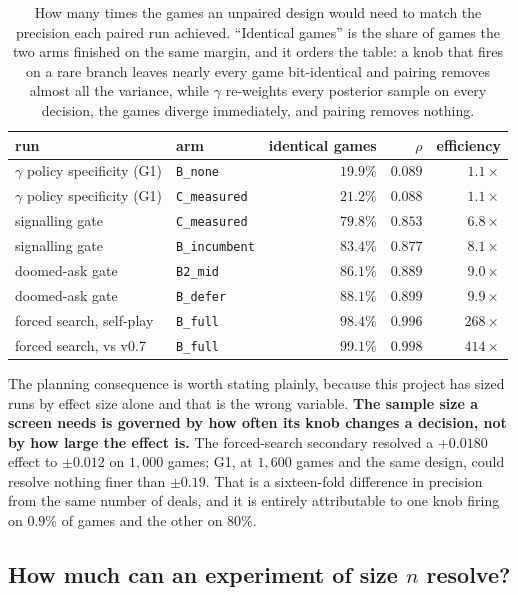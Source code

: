 \documentclass[11pt,a4paper]{article}
\begin{document}
\begin{table}[t]
\centering
\begin{tabular}{llrrr}
\toprule
run & arm & identical games & $\rho$ & efficiency \\
\midrule
$\gamma$ policy specificity (G1) & \texttt{B\_none} & $19.9\%$ & $0.089$ & $1.1\times$ \\
$\gamma$ policy specificity (G1) & \texttt{C\_measured} & $21.2\%$ & $0.088$ & $1.1\times$ \\
signalling gate & \texttt{C\_measured} & $79.8\%$ & $0.853$ & $6.8\times$ \\
signalling gate & \texttt{B\_incumbent} & $83.4\%$ & $0.877$ & $8.1\times$ \\
doomed-ask gate & \texttt{B2\_mid} & $86.1\%$ & $0.889$ & $9.0\times$ \\
doomed-ask gate & \texttt{B\_defer} & $88.1\%$ & $0.899$ & $9.9\times$ \\
forced search, self-play & \texttt{B\_full} & $98.4\%$ & $0.996$ & $268\times$ \\
forced search, vs v0.7 & \texttt{B\_full} & $99.1\%$ & $0.998$ & $414\times$ \\
\bottomrule
\end{tabular}
\caption{How many times the games an unpaired design would need to match the
precision each paired run achieved. ``Identical games'' is the share of games
the two arms finished on the same margin, and it orders the table: a knob that
fires on a rare branch leaves nearly every game bit-identical and pairing
removes almost all the variance, while $\gamma$ re-weights every posterior
sample on every decision, the games diverge immediately, and pairing removes
nothing.}
\label{tab:pairing}
\end{table}

The planning consequence is worth stating plainly, because this project has
sized runs by effect size alone and that is the wrong variable. \textbf{The
sample size a screen needs is governed by how often its knob changes a
decision, not by how large the effect is.} The forced-search secondary
resolved a $+0.0180$ effect to $\pm 0.012$ on $1{,}000$ games; G1, at $1{,}600$
games and the same design, could resolve nothing finer than $\pm 0.19$. That is
a sixteen-fold difference in precision from the same number of deals, and it
is entirely attributable to one knob firing on $0.9\%$ of games and the other
on $80\%$.

\subsection{How much can an experiment of size \texorpdfstring{$n$}{n} resolve?}
\end{document}
